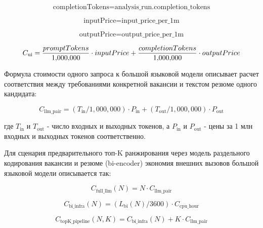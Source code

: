 \begin{equation}
\label{eq:completiontokens-2}
\text{completionTokens} = \text{analysis\_run.completion\_tokens}
\end{equation}

\begin{equation}
\label{eq:inputprice-3}
\text{inputPrice} = \text{input\_price\_per\_1m}
\end{equation}

\begin{equation}
\label{eq:outputprice-4}
\text{outputPrice} = \text{output\_price\_per\_1m}
\end{equation}

\begin{equation}
\label{eq:c_ui-5}
C_{\text{ui}} = \frac{promptTokens}{1{,}000{,}000} \cdot inputPrice \\
         + \frac{completionTokens}{1{,}000{,}000} \cdot outputPrice
\end{equation}

Формула стоимости одного запроса к большой языковой модели описывает расчет соответствия между требованиями конкретной вакансии и текстом резюме одного кандидата:

\begin{equation}
\label{eq:c_llm_pair-6}
C_{\text{llm\_pair}} = (T_{\text{in}} / 1{,}000{,}000) \cdot P_{\text{in}} + (T_{\text{out}} / 1{,}000{,}000) \cdot P_{\text{out}}
\end{equation}

где $T_{\text{in}}$ и $T_{\text{out}}$ - число входных и выходных токенов, а $P_{\text{in}}$ и $P_{\text{out}}$ - цены за 1 млн входных и выходных токенов соответственно.

Для сценария предварительного топ-K ранжирования через модель раздельного кодирования вакансии и резюме (bi-encoder) экономия внешних вызовов большой языковой модели описывается так:

\begin{equation}
\label{eq:c_full_llm-7}
C_{\text{full\_llm}}(N) = N \cdot C_{\text{llm\_pair}}
\end{equation}

\begin{equation}
\label{eq:c_bi_infra-8}
C_{\text{bi\_infra}}(N) = (L_{\text{bi}}(N) / 3600) \cdot C_{\text{cpu\_hour}}
\end{equation}

\begin{equation}
\label{eq:c_topk_pipeline-9}
C_{\text{topK\_pipeline}}(N, K) = C_{\text{bi\_infra}}(N) + K \cdot C_{\text{llm\_pair}}
\end{equation}

